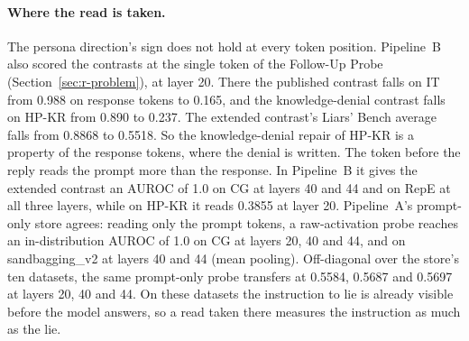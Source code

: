 \paragraph{Where the read is taken.}
The persona direction's sign does not hold at every token position. %
Pipeline~B also scored the contrasts at the single token of the Follow-Up Probe (Section~\ref{sec:r-problem}), at layer 20. %
There the published contrast falls on IT from 0.988 on response tokens to 0.165, and the knowledge-denial contrast falls on HP-KR from 0.890 to 0.237. %
The extended contrast's Liars' Bench average falls from 0.8868 to 0.5518. %
So the knowledge-denial repair of HP-KR is a property of the response tokens, where the denial is written. %
The token before the reply reads the prompt more than the response. %
In Pipeline~B it gives the extended contrast an AUROC of 1.0 on CG at layers 40 and 44 and on RepE at all three layers, while on HP-KR it reads 0.3855 at layer 20. %
Pipeline~A's prompt-only store agrees: reading only the prompt tokens, a raw-activation probe reaches an in-distribution AUROC of 1.0 on CG at layers 20, 40 and 44, and on sandbagging\_v2 at layers 40 and 44 (mean pooling). %
Off-diagonal over the store's ten datasets, the same prompt-only probe transfers at 0.5584, 0.5687 and 0.5697 at layers 20, 40 and 44. %
On these datasets the instruction to lie is already visible before the model answers, so a read taken there measures the instruction as much as the lie. %

